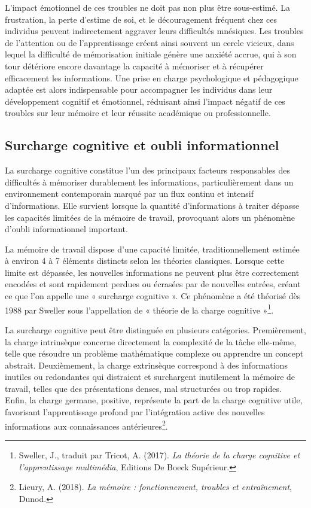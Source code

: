 \documentclass[12pt,a4paper]{report}
\begin{document}
L'impact émotionnel de ces troubles ne doit pas non plus être sous-estimé. La frustration, la perte d'estime de soi, et le découragement fréquent chez ces individus peuvent indirectement aggraver leurs difficultés mnésiques. Les troubles de l’attention ou de l’apprentissage créent ainsi souvent un cercle vicieux, dans lequel la difficulté de mémorisation initiale génère une anxiété accrue, qui à son tour détériore encore davantage la capacité à mémoriser et à récupérer efficacement les informations. Une prise en charge psychologique et pédagogique adaptée est alors indispensable pour accompagner les individus dans leur développement cognitif et émotionnel, réduisant ainsi l'impact négatif de ces troubles sur leur mémoire et leur réussite académique ou professionnelle.

\subsection{Surcharge cognitive et oubli informationnel}
La surcharge cognitive constitue l’un des principaux facteurs responsables des difficultés à mémoriser durablement les informations, particulièrement dans un environnement contemporain marqué par un flux continu et intensif d’informations. Elle survient lorsque la quantité d’informations à traiter dépasse les capacités limitées de la mémoire de travail, provoquant alors un phénomène d’oubli informationnel important.

La mémoire de travail dispose d’une capacité limitée, traditionnellement estimée à environ 4 à 7 éléments distincts selon les théories classiques. Lorsque cette limite est dépassée, les nouvelles informations ne peuvent plus être correctement encodées et sont rapidement perdues ou écrasées par de nouvelles entrées, créant ce que l'on appelle une « surcharge cognitive ». Ce phénomène a été théorisé dès 1988 par Sweller sous l’appellation de « théorie de la charge cognitive »\footnote{Sweller, J., traduit par Tricot, A. (2017). \textit{La théorie de la charge cognitive et l'apprentissage multimédia}, Editions De Boeck Supérieur.}.

La surcharge cognitive peut être distinguée en plusieurs catégories. Premièrement, la charge intrinsèque concerne directement la complexité de la tâche elle-même, telle que résoudre un problème mathématique complexe ou apprendre un concept abstrait. Deuxièmement, la charge extrinsèque correspond à des informations inutiles ou redondantes qui distraient et surchargent inutilement la mémoire de travail, telles que des présentations denses, mal structurées ou trop rapides. Enfin, la charge germane, positive, représente la part de la charge cognitive utile, favorisant l’apprentissage profond par l’intégration active des nouvelles informations aux connaissances antérieures\footnote{Lieury, A. (2018). \textit{La mémoire : fonctionnement, troubles et entraînement}, Dunod.}.
\end{document}
